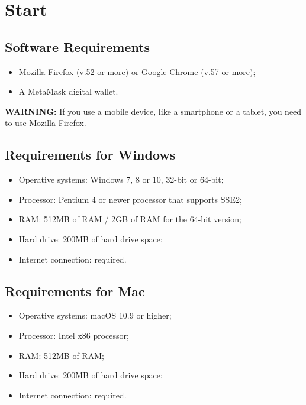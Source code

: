 \documentclass[ManualeUtente]{subfiles}
\begin{document}
\chapter{Start}

\section{Software Requirements}
\begin{itemize}
	\item \href{https://www.mozilla.org/en-US/firefox/new/}{Mozilla Firefox} (v.52 or more) or	
	\href{https://www.google.com/intl/en/chrome/}{Google Chrome} (v.57 or more);
	\item A MetaMask digital wallet.
\end{itemize}

\textbf{WARNING:} If you use a mobile device, like a smartphone or a tablet, you need to use Mozilla Firefox.

\section{Requirements for Windows}
\begin{itemize}
	\item {Operative systems:} Windows 7, 8 or 10, 32-bit or 64-bit;
	\item {Processor:} Pentium 4 or newer processor that supports SSE2;
	\item {RAM:} 512MB of RAM / 2GB of RAM for the 64-bit version;
	\item {Hard drive:} 200MB of hard drive space;
	\item {Internet connection:} required.
\end{itemize}

\section{Requirements for Mac}
\begin{itemize}
	\item {Operative systems:} macOS 10.9 or higher;
	\item {Processor:} Intel x86 processor;
	\item {RAM:} 512MB of RAM;
	\item {Hard drive:} 200MB of hard drive space;
	\item {Internet connection:} required.
\end{itemize}
\end{document}
